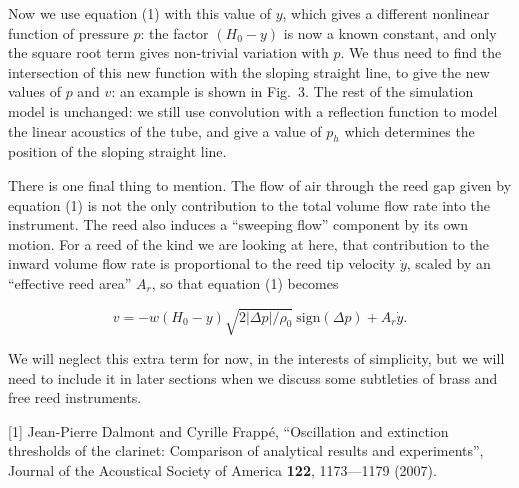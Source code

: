   Now we use equation (1) with this value of $y$, which gives a different 
  nonlinear function of pressure $p$: the factor $(H_0-y)$ is now a known 
  constant, and only the square root term gives non-trivial variation with $p$. 
  We thus need to find the intersection of this new function with the sloping 
  straight line, to give the new values of $p$ and $v$: an example is shown in 
  Fig.\ 3. The rest of the simulation model is unchanged: we still use 
  convolution with a reflection function to model the linear acoustics of the 
  tube, and give a value of $p_h$ which determines the position of the sloping 
  straight line. 


  There is one final thing to mention. The flow of air through the reed gap 
  given by equation (1) is not the only contribution to the total volume flow 
  rate into the instrument. The reed also induces a ``sweeping flow'' component 
  by its own motion. For a reed of the kind we are looking at here, that 
  contribution to the inward volume flow rate is proportional to the reed tip 
  velocity $\dot{y}$, scaled by an ``effective reed area'' $A_r$, so that 
  equation (1) becomes 

  \begin{equation*}v=-w(H_0-y) \sqrt{2 |\Delta p|/\rho_0} \mathrm{~sign} 
  (\Delta p)+A_r \dot{y} . \tag{14}\end{equation*} 

  We will neglect this extra term for now, in the interests of simplicity, but 
  we will need to include it in later sections when we discuss some subtleties 
  of brass and free reed instruments. 

  \sectionreferences{}[1] Jean-Pierre Dalmont and Cyrille Frappé, “Oscillation 
  and extinction thresholds of the clarinet: Comparison of analytical results 
  and experiments”, Journal of the Acoustical Society of America \textbf{122}, 
  1173—1179 (2007). 